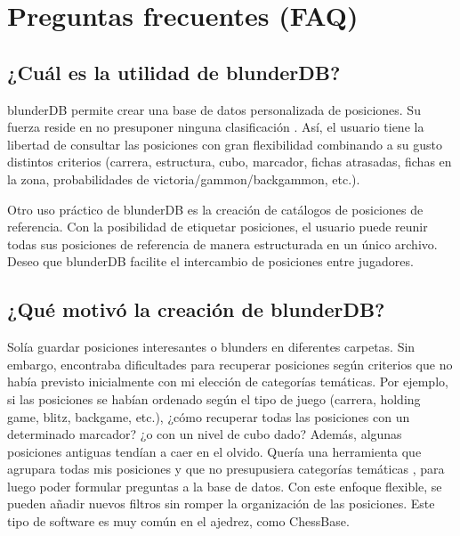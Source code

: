 \documentclass[letterpaper,10pt,spanish]{sphinxmanual}
\begin{document}
\sphinxstepscope


\section{Preguntas frecuentes (FAQ)}
\label{\detokenize{faq:foire-aux-questions}}\label{\detokenize{faq:faq}}\label{\detokenize{faq::doc}}

\subsection{¿Cuál es la utilidad de blunderDB?}
\label{\detokenize{faq:quel-est-l-utilite-de-blunderdb}}
\sphinxAtStartPar
blunderDB permite crear una base de datos personalizada de posiciones. Su fuerza reside en no presuponer ninguna clasificación . Así, el usuario tiene la libertad de consultar las posiciones con gran flexibilidad combinando a su gusto distintos criterios (carrera, estructura, cubo, marcador, fichas atrasadas, fichas en la zona, probabilidades de victoria/gammon/backgammon, etc.).

\sphinxAtStartPar
Otro uso práctico de blunderDB es la creación de catálogos de posiciones de referencia. Con la posibilidad de etiquetar posiciones, el usuario puede reunir todas sus posiciones de referencia de manera estructurada en un único archivo. Deseo que blunderDB facilite el intercambio de posiciones entre jugadores.


\subsection{¿Qué motivó la creación de blunderDB?}
\label{\detokenize{faq:qu-est-ce-qui-a-motive-la-creation-de-blunderdb}}
\sphinxAtStartPar
Solía guardar posiciones interesantes o blunders en diferentes carpetas. Sin embargo, encontraba dificultades para recuperar posiciones según criterios que no había previsto inicialmente con mi elección de categorías temáticas. Por ejemplo, si las posiciones se habían ordenado según el tipo de juego (carrera, holding game, blitz, backgame, etc.), ¿cómo recuperar todas las posiciones con un determinado marcador? ¿o con un nivel de cubo dado? Además, algunas posiciones antiguas tendían a caer en el olvido. Quería una herramienta que agrupara todas mis posiciones y que no presupusiera categorías temáticas , para luego poder formular preguntas a la base de datos. Con este enfoque flexible, se pueden añadir nuevos filtros sin romper la organización de las posiciones. Este tipo de software es muy común en el ajedrez, como ChessBase.
\end{document}
